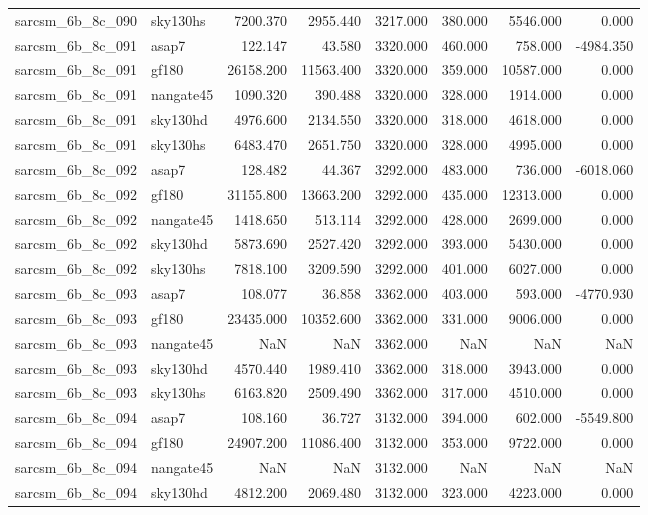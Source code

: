 \begin{tabular}{llrrrrrr}
sarcsm\_6b\_8c\_090 & sky130hs & 7200.370 & 2955.440 & 3217.000 & 380.000 & 5546.000 & 0.000 \\
sarcsm\_6b\_8c\_091 & asap7 & 122.147 & 43.580 & 3320.000 & 460.000 & 758.000 & -4984.350 \\
sarcsm\_6b\_8c\_091 & gf180 & 26158.200 & 11563.400 & 3320.000 & 359.000 & 10587.000 & 0.000 \\
sarcsm\_6b\_8c\_091 & nangate45 & 1090.320 & 390.488 & 3320.000 & 328.000 & 1914.000 & 0.000 \\
sarcsm\_6b\_8c\_091 & sky130hd & 4976.600 & 2134.550 & 3320.000 & 318.000 & 4618.000 & 0.000 \\
sarcsm\_6b\_8c\_091 & sky130hs & 6483.470 & 2651.750 & 3320.000 & 328.000 & 4995.000 & 0.000 \\
sarcsm\_6b\_8c\_092 & asap7 & 128.482 & 44.367 & 3292.000 & 483.000 & 736.000 & -6018.060 \\
sarcsm\_6b\_8c\_092 & gf180 & 31155.800 & 13663.200 & 3292.000 & 435.000 & 12313.000 & 0.000 \\
sarcsm\_6b\_8c\_092 & nangate45 & 1418.650 & 513.114 & 3292.000 & 428.000 & 2699.000 & 0.000 \\
sarcsm\_6b\_8c\_092 & sky130hd & 5873.690 & 2527.420 & 3292.000 & 393.000 & 5430.000 & 0.000 \\
sarcsm\_6b\_8c\_092 & sky130hs & 7818.100 & 3209.590 & 3292.000 & 401.000 & 6027.000 & 0.000 \\
sarcsm\_6b\_8c\_093 & asap7 & 108.077 & 36.858 & 3362.000 & 403.000 & 593.000 & -4770.930 \\
sarcsm\_6b\_8c\_093 & gf180 & 23435.000 & 10352.600 & 3362.000 & 331.000 & 9006.000 & 0.000 \\
sarcsm\_6b\_8c\_093 & nangate45 & NaN & NaN & 3362.000 & NaN & NaN & NaN \\
sarcsm\_6b\_8c\_093 & sky130hd & 4570.440 & 1989.410 & 3362.000 & 318.000 & 3943.000 & 0.000 \\
sarcsm\_6b\_8c\_093 & sky130hs & 6163.820 & 2509.490 & 3362.000 & 317.000 & 4510.000 & 0.000 \\
sarcsm\_6b\_8c\_094 & asap7 & 108.160 & 36.727 & 3132.000 & 394.000 & 602.000 & -5549.800 \\
sarcsm\_6b\_8c\_094 & gf180 & 24907.200 & 11086.400 & 3132.000 & 353.000 & 9722.000 & 0.000 \\
sarcsm\_6b\_8c\_094 & nangate45 & NaN & NaN & 3132.000 & NaN & NaN & NaN \\
sarcsm\_6b\_8c\_094 & sky130hd & 4812.200 & 2069.480 & 3132.000 & 323.000 & 4223.000 & 0.000 \\

\end{tabular}
